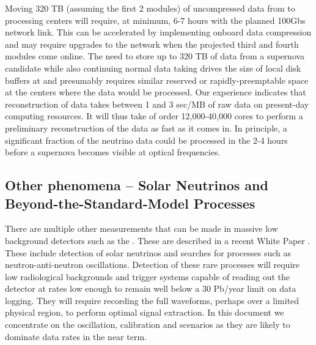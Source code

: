 \documentclass[../main-v1.tex]{subfiles}
\begin{document}



Moving  320 TB (assuming the first 2 modules) of uncompressed data   from  to processing centers will require, at minimum, 6-7 hours with the planned 100Gbs network link.  This can be accelerated by implementing onboard data compression and may require upgrades to the network when the projected third and fourth modules come online.  The need to store up to 320 TB of data from a supernova candidate while also continuing normal data taking drives the size of local disk buffers at  and presumably requires similar reserved or rapidly-preemptable space at the centers where the data would be processed. Our  experience indicates that reconstruction of  data takes between 1 and 3 sec/MB of raw data on present-day computing resources.  It will thus take of order 12,000-40,000 cores to perform a preliminary reconstruction of the data as fast as it comes in. In principle, a significant fraction of the neutrino data could be processed  in the 2-4 hours before a supernova becomes visible at optical frequencies.


\subsection{Other phenomena -- Solar Neutrinos and Beyond-the-Standard-Model Processes} %
There are multiple other measurements that can be made in  massive low background detectors such as the .  These are described in a recent White Paper \cite{Caratelli:2022llt}. These include detection of solar neutrinos and searches for  processes such as neutron-anti-neutron oscillations.  Detection of these rare processes will require low radiological backgrounds and trigger systems capable of reading out the detector at rates low enough to remain well below a 30 Pb/year limit on data logging.  They will require recording the full waveforms, perhaps over a limited physical region, to perform optimal signal extraction. In this document we concentrate on the oscillation, calibration and  scenarios as they are likely to dominate data rates in the near term.  
\end{document}
